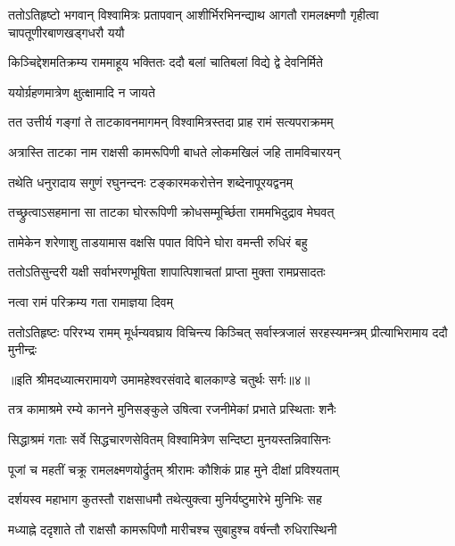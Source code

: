 \threelineshloka
{ततोऽतिहृष्टो भगवान् विश्वामित्रः प्रतापवान्}
{आशीर्भिरभिनन्द्याथ आगतौ रामलक्ष्मणौ}
{गृहीत्वा चापतूणीरबाणखड्गधरौ ययौ} %

\twolineshloka
{किञ्चिद्देशमतिक्रम्य राममाहूय भक्तितः}
{ददौ बलां चातिबलां विद्ये द्वे देवनिर्मिते} %

\onelineshloka
{ययोर्ग्रहणमात्रेण क्षुत्क्षामादि न जायते} %

\twolineshloka
{तत उत्तीर्य गङ्गां ते ताटकावनमागमन्}
{विश्वामित्रस्तदा प्राह रामं सत्यपराक्रमम्} %

\twolineshloka
{अत्रास्ति ताटका नाम राक्षसी कामरूपिणी}
{बाधते लोकमखिलं जहि तामविचारयन्} %

\twolineshloka
{तथेति धनुरादाय सगुणं रघुनन्दनः}
{टङ्कारमकरोत्तेन शब्देनापूरयद्वनम्} %

\twolineshloka
{तच्छ्रुत्वाऽसहमाना सा ताटका घोररूपिणी}
{क्रोधसम्मूर्च्छिता राममभिदुद्राव मेघवत्} %

\twolineshloka
{तामेकेन शरेणाशु ताडयामास वक्षसि}
{पपात विपिने घोरा वमन्ती रुधिरं बहु} %

\twolineshloka
{ततोऽतिसुन्दरी यक्षी सर्वाभरणभूषिता}
{शापात्पिशाचतां प्राप्ता मुक्ता रामप्रसादतः} %

\onelineshloka
{नत्वा रामं परिक्रम्य गता रामाज्ञया दिवम्} %

\fourlineindentedshloka
{ततोऽतिहृष्टः परिरभ्य रामम्}
{मूर्धन्यवघ्राय विचिन्त्य किञ्चित्}
{सर्वास्त्रजालं सरहस्यमन्त्रम्}
{प्रीत्याभिरामाय ददौ मुनीन्द्रः} %

{॥इति श्रीमदध्यात्मरामायणे उमामहेश्वरसंवादे
बालकाण्डे चतुर्थः सर्गः॥४॥
}





\twolineshloka
{तत्र कामाश्रमे रम्ये कानने मुनिसङ्कुले}
{उषित्वा रजनीमेकां प्रभाते प्रस्थिताः शनैः} %

\twolineshloka
{सिद्धाश्रमं गताः सर्वे सिद्धचारणसेवितम्}
{विश्वामित्रेण सन्दिष्टा मुनयस्तन्निवासिनः} %

\twolineshloka
{पूजां च महतीं चक्रू रामलक्ष्मणयोर्द्रुतम्}
{श्रीरामः कौशिकं प्राह मुने दीक्षां प्रविश्यताम्} %

\twolineshloka
{दर्शयस्व महाभाग कुतस्तौ राक्षसाधमौ}
{तथेत्युक्त्वा मुनिर्यष्टुमारेभे मुनिभिः सह} %

\twolineshloka
{मध्याह्ने ददृशाते तौ राक्षसौ कामरूपिणौ}
{मारीचश्च सुबाहुश्च वर्षन्तौ रुधिरास्थिनी} %


